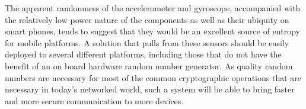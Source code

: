 
The apparent randomness of the accelerometer and gyroscope, accompanied with the
relatively low power nature of the components as well as their ubiquity on smart
phones, tends to suggest that they would be an excellent source of entropy for
mobile platforms. A solution that pulls from these sensors should be easily
deployed to several different platforms, including those that do not have the
benefit of an on board hardware random number generator. As quality random
numbers are necessary for most of the common cryptographic operations that are
necessary in today's networked world, such a system will be able to bring faster
and more secure communication to more devices. 
